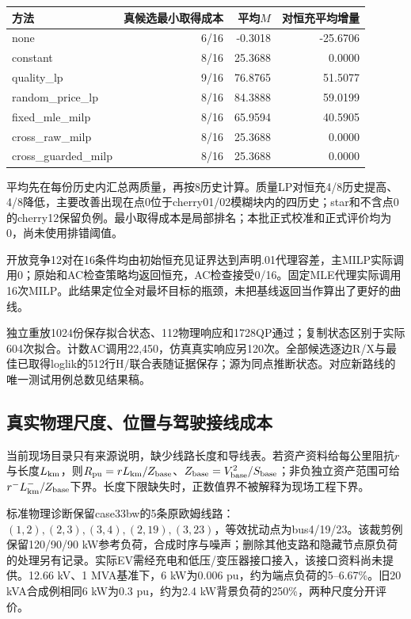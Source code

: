 \documentclass[UTF8,fontset=fandol,11pt,a4paper]{ctexart}
\begin{document}
\begin{center}\begin{tabular}{lrrr}
\toprule 方法 & 真候选最小取得成本 & 平均$M$ & 对恒充平均增量\\\midrule
none & 6/16 & -0.3018 & -25.6706\\
constant & 8/16 & 25.3688 & 0.0000\\
quality\_lp & 9/16 & 76.8765 & 51.5077\\
random\_price\_lp & 8/16 & 84.3888 & 59.0199\\
fixed\_mle\_milp & 8/16 & 65.9594 & 40.5905\\
cross\_raw\_milp & 8/16 & 25.3688 & 0.0000\\
cross\_guarded\_milp & 8/16 & 25.3688 & 0.0000\\
\bottomrule\end{tabular}\end{center}
平均先在每份历史内汇总两质量，再按8历史计算。质量LP对恒充4/8历史提高、4/8降低，主要改善出现在点0位于cherry01/02模糊块内的四历史；star和不含点0的cherry12保留负例。最小取得成本是局部排名；本批正式校准和正式评价均为0，尚未使用排错阈值。

开放竞争12对在16条件均由初始恒充见证界达到声明.01代理容差，主MILP实际调用0；原始和AC检查策略均返回恒充，AC检查接受0/16。固定MLE代理实际调用16次MILP。此结果定位全对最坏目标的瓶颈，未把基线返回当作算出了更好的曲线。

独立重放1024份保存拟合状态、112物理响应和1728QP通过；复制状态区别于实际604次拟合。计数AC调用22,450，仿真真实响应另120次。全部候选逐边R/X与最佳已取得loglik的512行H/联合表随证据保存；源为同点推断状态。对应新路线的唯一测试用例总数见结果稿。


\subsection{真实物理尺度、位置与驾驶接线成本}
当前现场目录只有来源说明，缺少线路长度和导线表。若资产资料给每公里阻抗$r$与长度$L_{\rm km}$，则$R_{\rm pu}=rL_{\rm km}/Z_{\rm base}$、$Z_{\rm base}=V_{\rm base}^2/S_{\rm base}$；非负独立资产范围可给$r^-L^-_{\rm km}/Z_{\rm base}$下界。长度下限缺失时，正数值界不被解释为现场工程下界。

标准物理诊断保留case33bw的5条原欧姆线路：$(1,2),(2,3),(3,4),(2,19),(3,23)$，等效扰动点为bus4/19/23。该裁剪例保留120/90/90 kW参考负荷，合成时序与噪声；删除其他支路和隐藏节点原负荷的处理另有记录。实际EV需经充电和低压/变压器接口接入，该接口资料尚未提供。12.66 kV、1 MVA基准下，6 kW为0.006 pu，约为端点负荷的5--6.67\%。旧20 kVA合成例相同6 kW为0.3 pu，约为2.4 kW背景负荷的250\%，两种尺度分开评价。
\end{document}

